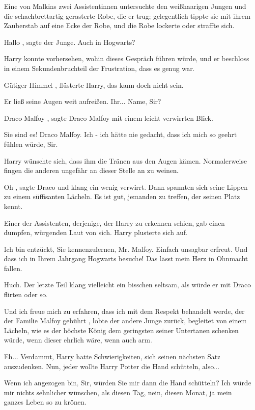 Eine von Malkins zwei
Assistentinnen untersuchte den weißhaarigen Jungen und die schachbrettartig gerasterte Robe, die er trug; gelegentlich
tippte sie mit ihrem Zauberstab auf eine Ecke der Robe, und die Robe lockerte oder straffte sich.

\glqq Hallo\grqq{} , sagte der Junge. \glqq Auch in Hogwarts?\grqq{}

Harry konnte vorhersehen,
wohin dieses Gespräch führen würde, und er beschloss in einem Sekundenbruchteil der Frustration, dass es genug war.

\glqq Gütiger Himmel\grqq{} , flüsterte Harry, \glqq das kann doch nicht sein.\grqq{}

Er ließ seine
Augen weit aufreißen. \glqq Ihr... Name, Sir?\grqq{}

\glqq Draco Malfoy\grqq{} , sagte Draco Malfoy mit einem
leicht verwirrten Blick.

\glqq Sie sind es! Draco Malfoy. Ich - ich hätte nie gedacht, dass ich mich so
geehrt fühlen würde, Sir.\grqq{}

Harry wünschte sich, dass ihm die Tränen aus den Augen kämen. Normalerweise
fingen die anderen ungefähr an dieser Stelle an zu weinen.

\glqq Oh\grqq{} , sagte Draco und klang ein wenig
verwirrt. Dann spannten sich seine Lippen zu einem süffisanten Lächeln.
\glqq Es ist gut, jemanden zu treffen, der
seinen Platz kennt.\grqq{}

Einer der Assistenten, derjenige, der Harry zu erkennen schien, gab einen dumpfen,
würgenden Laut von sich. Harry plusterte sich auf.

\glqq Ich bin entzückt, Sie kennenzulernen, Mr. Malfoy.
Einfach unsagbar erfreut. Und dass ich in Ihrem Jahrgang Hogwarts besuche! Das lässt mein Herz in Ohnmacht fallen.\grqq{}

Huch. Der letzte Teil klang vielleicht ein bisschen seltsam, als würde er mit Draco flirten oder so.

\glqq Und ich freue mich zu erfahren, dass ich mit dem Respekt behandelt werde, der der Familie Malfoy
gebührt\grqq{} ,
lobte der andere Junge zurück, begleitet von einem Lächeln, wie es der höchste König dem geringsten
seiner Untertanen schenken würde, wenn dieser ehrlich wäre, wenn auch arm.

Eh... Verdammt, Harry hatte
Schwierigkeiten, sich seinen nächsten Satz auszudenken. Nun, jeder wollte Harry Potter die Hand schütteln, also...

\glqq Wenn ich angezogen bin, Sir, würden Sie mir dann die Hand schütteln? Ich würde mir nichts sehnlicher
wünschen, als diesen Tag, nein, diesen Monat, ja mein ganzes Leben so zu krönen.\grqq{}

